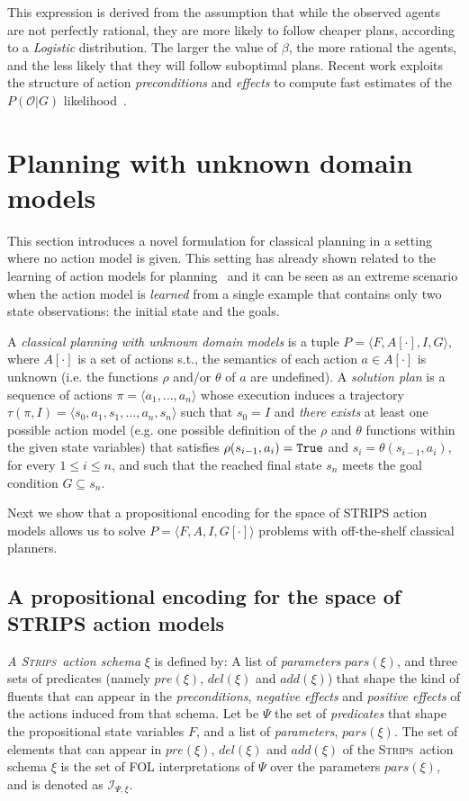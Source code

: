 \documentclass[letterpaper]{article} %
\newcommand{\tup}[1]{{\langle #1 \rangle}}
\newcommand{\strips}{\textsc{Strips}}     %
\begin{document}
This expression is derived from the assumption that while the observed agents are not perfectly rational, they are more likely to follow cheaper plans, according to a {\em Logistic} distribution. The larger the value of $\beta$, the more rational the agents, and the less likely that they will follow suboptimal plans. Recent work exploits the structure of action {\em preconditions} and {\em effects} to compute fast estimates of the $P(\mathcal{O}|G)$ likelihood~\cite{pereira2017landmark}.



\section{Planning with unknown domain models}
\label{sec:planning}
This section introduces a novel formulation for classical planning in a setting where no action model is given. This setting has already shown related to the learning of action models for planning~\cite{SternJ17} and it can be seen as an extreme scenario when the action model is {\em learned} from a single example that contains only two state observations: the initial state and the goals.

A {\em classical planning with unknown domain models} is a tuple $P=\tup{F,A[\cdot],I,G}$, where $A[\cdot]$ is a set of actions s.t., the semantics of each action $a\in A[\cdot]$ is unknown (i.e. the functions $\rho$ and/or $\theta$ of $a$ are undefined). A {\em solution plan} is a sequence of actions $\pi=\tup{a_1, \ldots, a_n}$ whose execution induces a trajectory $\tau(\pi,I)=\tup{s_0, a_1, s_1, \ldots, a_n, s_n}$ such that $s_0=I$ and {\em there exists} at least one possible action model (e.g. one possible definition of the $\rho$ and $\theta$ functions within the given state variables) that satisfies $\rho(s_{i-1},a_i)={\tt\small True}$ and $s_i=\theta(s_{i-1},a_i)$, for every {\small $1\leq i\leq n$}, and such that the reached final state $s_n$ meets the goal condition $G \subseteq s_n$. 

Next we show that a propositional encoding for the space of STRIPS action models allows us to solve $P=\tup{F,A,I,G[\cdot]}$ problems with off-the-shelf classical planners.


\subsection{A propositional encoding for the space of STRIPS action models}
{\em A \strips\ action schema} $\xi$ is defined by: A list of {\em parameters} $pars(\xi)$, and three sets of predicates (namely $pre(\xi)$, $del(\xi)$ and $add(\xi)$) that shape the kind of fluents that can appear in the {\em preconditions}, {\em negative effects} and {\em positive effects} of the actions induced from that schema. Let be $\Psi$ the set of {\em predicates} that shape the propositional state variables $F$, and a list of {\em parameters}, $pars(\xi)$. The set of elements that can appear in $pre(\xi)$, $del(\xi)$ and $add(\xi)$ of the \strips\ action schema $\xi$ is the set of FOL interpretations of $\Psi$ over the parameters $pars(\xi)$, and is denoted as ${\mathcal I}_{\Psi,\xi}$.
\end{document}
